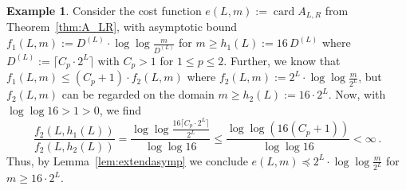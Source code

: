 \documentclass[12pt]{article}
\theoremstyle{plain}
\theoremstyle{definition}
\newtheorem{example}[theorem]{Example}
\DeclareMathOperator{\card}{card}
\begin{document}
\begin{example} \label{ex:e(L,m)}
    Consider the cost function
    $e(L,m) := \card A_{L,R}$
    from Theorem~\ref{thm:A_LR},
    with asymptotic bound $f_1(L,m) := D^{(L)} \cdot \log \log \frac{m}{D^{(L)}}$
    for $m \geq h_1(L) := 16 \, D^{(L)}$ where $D^{(L)} := \lceil C_p \cdot 2^L \rceil$ with $C_p > 1$ for $1 \leq p \leq 2$.
    Further, we know that \mbox{$f_1(L,m) \leq (C_p+1) \cdot f_2(L,m)$} where $f_2(L,m) := 2^L \cdot \log \log \frac{m}{2^L}$,
    but $f_2(L,m)$ can be regarded on the domain \mbox{$m \geq h_2(L) := 16 \cdot 2^L$}.
    Now, with $\log \log 16 > 1 > 0$, we find
    \begin{equation*}
        \frac{f_2(L, h_1(L))}{f_2(L,h_2(L))}
            = \frac{\log \log \frac{16 \lceil C_p \cdot 2^L\rceil}{2^L}}{\log \log 16}
            \leq \frac{\log \log (16 (C_p + 1))}{\log \log 16} < \infty \,.
    \end{equation*}
    Thus, by Lemma~\ref{lem:extendasymp} we conclude
    $e(L,m) \preceq 2^L \cdot \log \log \frac{m}{2^L}$ for $m \geq 16 \cdot 2^L$.
\end{example}




\end{document}
